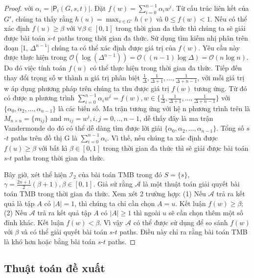 \begin{proof}
	với $\alpha_i=|\mathsf{P}_i(G, s, t)|$. Đặt $f(w)=\sum_{i=0}^{n-1}\alpha_i w^i$. Từ cấu trúc liên kết của $G'$, chúng ta thấy rằng $h(u)=\max_{v \in G'}h(v)$ và $0 \leq  f(w) < 1$. Nếu có thể xác định $f(u) \geq \beta$ với $\forall \beta \in [0, 1]$ trong thời gian đa thức thì chúng ta sẽ giải được bài toán $s$-$t$ paths trong thời gian đa thức. Sử dụng tìm kiếm nhị phân trên đoạn [1, $\Delta^{n-1}$] chúng ta có thể xác định được giá trị của $f(w)$. Yêu cầu này được thực hiện trong $\mathcal{O}(\log(\Delta^{n-1}))=\mathcal{O}((n-1)\log\Delta) =\mathcal{O}(n\log n)$. Do đó việc tính toán $f(u)$ có thể thực hiện trong thời gian đa thức. Tiếp đến thay đổi trọng số w thành n giá trị phân biệt $\frac{1}{\Delta}, \frac{1}{\Delta+1}, \ldots, \frac{1}{\Delta+n-1}$, với mỗi giá trị w áp dụng phương pháp trên chúng ta thu được giá trị $f(w)$ tương ứng. Từ đó có được n phương trình $\sum_{i=0}^{n-1}\alpha_i w^i =f(w), w \in \{\frac{1}{\Delta}, \frac{1}{\Delta+1}, \ldots, \frac{1}{\Delta+n-1} \}$ với $\{\alpha_0, \alpha_2, \ldots, \alpha_{n-1}\}$ là các biến số. Ma trận tương ứng với hệ n phương trình trên là $M_{n \times n}=\{m_{ij}\}$ and $m_{ij}=w^{i} , i,j=0,..,n-1$, dễ thấy đây là ma trận Vandermonde do đó có thể dễ dàng tìm được lời giải $\{\alpha_0, \alpha_2, \ldots, \alpha_{n-1}\}$. Tổng số $s$-$t$ paths trên đồ thị G là $\sum_{i=0}^{n-1} \alpha_i$. Vì thế, nếu chúng ta xác định được $f(u) \geq \beta$ với bất kì $\beta \in [0, 1]$ trong thời gian đa thức thì sẽ giải được bài toán $s$-$t$ paths trong thời gian đa thức. 
	
	Bây giờ, xét thể hiện $\mathcal{I}_2$ của bài toán TMB trong đó $S=\{s\}$, $\gamma = \frac{2n+1}{2}(\beta+ 1) , \beta \in [0, 1]$.  Giả sử rằng $\mathcal{A}$ là một thuật toán giải quyết bài toán TMB trong thời gian đa thức. Xem xét 2 trường hợp: (1) Nếu $\mathcal{A}$ trả ra kết quả là tập $A$ có $|A|=1$, thì chúng ta chỉ cần chọn $A={u}$. Kết luận $f(w) \geq \beta$; (2) Nếu $\mathcal{A}$ trả ra kết quả tập $A$ có $|A| \ge 1$ thì ngoài $u$ sẽ cần chọn thêm một số đỉnh khác. Kết luận $f(w) < \beta$. Vì vậy $\mathcal{A}$ có thể được sử dụng để so sánh $f(w)$ với $\beta$ và có thể giải quyết bài toán $s$-$t$ paths. Điều này chỉ ra rằng bài toán TMB là khó hơn hoặc bằng bài toán $s$-$t$ paths.
\end{proof}
\subsection{Thuật toán đề xuất}
